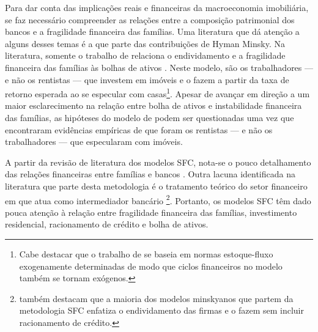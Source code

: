 Para dar conta das implicações reais e financeiras da macroeconomia imobiliária, se faz necessário compreender as relações entre a composição patrimonial dos bancos e a fragilidade financeira das famílias.
Uma literatura que dá atenção a alguns desses temas é a que parte das contribuições de Hyman Minsky.
Na literatura, somente o trabalho de \textcite{ryoo_household_2016} relaciona o endividamento e a fragilidade financeira das famílias às bolhas de ativos \cite{nikolaidi_minsky_2017}. 
Neste modelo, são os trabalhadores --- e não os rentistas --- que investem em imóveis e o fazem a partir da taxa de retorno esperada ao se especular com casas\footnote{Cabe destacar que o trabalho de \textcite{ryoo_household_2016} se baseia em normas estoque-fluxo exogenamente determinadas de modo que ciclos financeiros no modelo também se tornam exógenos.}.
Apesar de avançar em direção a um maior esclarecimento na relação entre bolha de ativos e instabilidade financeira das famílias, as hipóteses do modelo de \textcite{ryoo_household_2016} podem ser questionadas uma vez que \textcite{albanesi_credit_2017} encontraram evidências empíricas de que foram os rentistas ---  e não os trabalhadores --- que especularam com imóveis.


A partir da revisão de literatura dos modelos SFC, nota-se o pouco detalhamento das relações financeiras entre famílias e bancos \cite{lavoie_was_2020}. %
Outra lacuna identificada na literatura que parte desta metodologia é o tratamento teórico do setor financeiro em que atua como intermediador bancário \cite{le_heron_post-keynesian_2008}\footnote{\textcite{nikolaidi_minsky_2017} também destacam que a maioria dos modelos minskyanos que partem da metodologia SFC enfatiza o endividamento das firmas e o fazem sem incluir racionamento de crédito.}.
Portanto, os modelos SFC têm dado pouca atenção à relação entre fragilidade financeira das famílias, investimento residencial, racionamento de crédito e bolha de ativos. 


